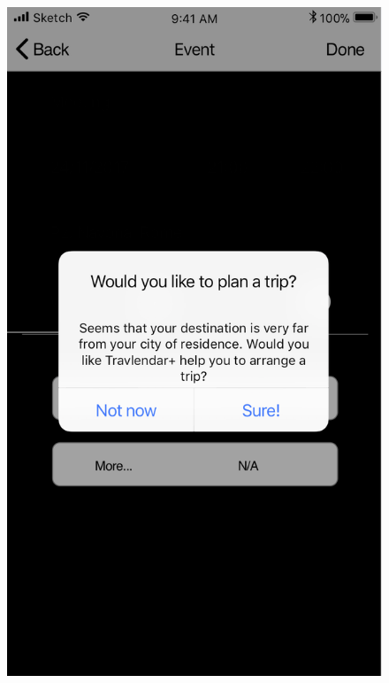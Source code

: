 \begin{enumerate}
			\begin{figure}[H]
				\centering
				\includegraphics[scale=0.25]{Images/Sketch/Trip_3}
				\hspace{0.5cm}

\end{figure}
\end{enumerate}
